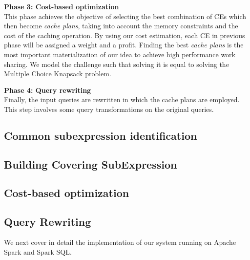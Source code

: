 \textbf{Phase 3: Cost-based optimization}\\
This phase achieves the objective of selecting the best combination of CEs which then become \emph{cache plans}, taking into account the memory constraints and the cost of the caching operation. By using our cost estimation, each CE in previous phase will be assigned a weight and a profit. Finding the best \emph{cache plans} is the most important materialization of our idea to achieve high performance work sharing. We model the challenge such that solving it is equal to solving the Multiple Choice Knapsack problem.

\textbf{Phase 4: Query rewriting}\\
Finally, the input queries are rewritten in which the cache plans are employed. This step involves some query transformations on the original queries.

\subsection{Common subexpression identification}
\label{sec:common_sub}


\subsection{Building Covering SubExpression}
\label{sec:covering_subexpression}


\subsection{Cost-based optimization}
\label{sec:cbo}


\subsection{Query Rewriting}
\label{sec:query_rewriting}


We next cover in detail the implementation of our system running on Apache Spark and Spark SQL.